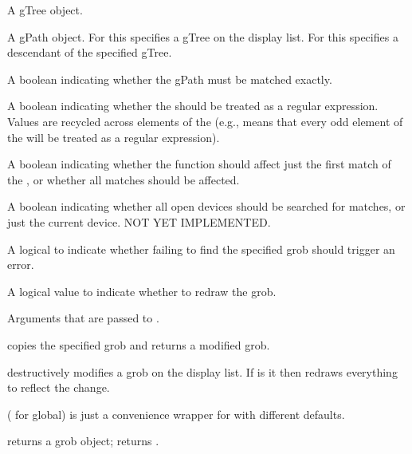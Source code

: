 \begin{Arguments}
\begin{ldescription}
\item[\code{gTree}] A gTree object.
\item[\code{gPath}]  A gPath object. For  this
specifies a gTree on the display list.  For  this
specifies a descendant of the specified gTree. 
\item[\code{strict}]  A boolean indicating whether the gPath must be
matched exactly. 
\item[\code{grep}] A boolean indicating whether the  should
be treated as a regular expression.  Values are recycled across
elements of the  (e.g.,  means
that every odd element of the  will be treated as
a regular expression).

\item[\code{global}]  A boolean indicating whether the function should affect
just the first match of the , or whether all matches
should be affected.

\item[\code{allDevices}]  A boolean indicating whether all open devices
should
be searched for matches, or just the current device.
NOT YET IMPLEMENTED.

\item[\code{warn}] A logical to indicate whether failing to find the
specified grob should trigger an error.  
\item[\code{redraw}] A logical value to indicate whether to redraw the grob. 
\item[\code{...}]  Arguments that are passed to . 
\end{ldescription}
\end{Arguments}
%
\begin{Details}\relax
{} copies the specified grob and returns a modified
grob.

 destructively modifies a grob on the display list.
If 
is  it then redraws everything to reflect the change.

 ( for global) is just a convenience wrapper for
 with different defaults.
\end{Details}
%
\begin{Value}
 returns a grob object;   returns
.
\end{Value}
